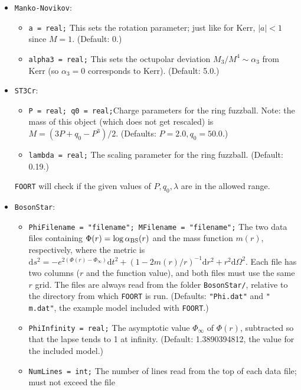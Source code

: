 \documentclass[11pt,a4paper]{article}
\newcommand{\code}[1]{{\tt #1}}
\newcommand{\rmd}{\mathrm{d}}
\begin{document}
\begin{itemize}
\item \code{Manko-Novikov}:
\begin{itemize}
\item \code{a = real;}\newline
This sets the rotation parameter; just like for Kerr, $|a|<1$ since $M=1$. (Default: 0.)
\item \code{alpha3 = real;}\newline
This sets the octupolar deviation $M_3/M^4\sim\alpha_3$ from Kerr (so $\alpha_3=0$ corresponds to Kerr). (Default: 5.0.)
\end{itemize}
\item \code{ST3Cr}:
\begin{itemize}
\item \code{P = real; q0 = real;}\newline Charge parameters for the ring fuzzball. Note: the mass of this object (which does not get rescaled) is $M=(3P+q_0-P^3)/2$. (Defaults: $P=2.0, q_0=50.0$.)
\item \code{lambda = real;} \newline The scaling parameter for the ring fuzzball. (Default: 0.19.)
\end{itemize}
\code{FOORT} will check if the given values of $P,q_0,\lambda$ are in the allowed range.
\item \code{BosonStar}: 
\begin{itemize}
\item \code{PhiFilename = "filename"; MFilename = "filename";}\newline
The two data files containing $\Phi(r) = \log\alpha_{\rm BS}(r)$ and the mass function
$m(r)$, respectively, where the metric is $\rmd s^2 = -e^{2(\Phi(r)-\Phi_\infty)
}\rmd t^2 + \left(1-2m(r)/r\right)^{-1}\rmd r^2 + r^2\rmd\Omega^2$. Each file has
two columns ($r$ and the function value), and both files must use the same $r$
grid. The files are always read from the folder \code{BosonStar/}, relative to the
directory from which \code{FOORT} is run. (Defaults: \code{"Phi.dat"} and \code{"
m.dat"}, the example model included with \code{FOORT}.)
\item \code{PhiInfinity = real;}\newline
The asymptotic value $\Phi_\infty$ of $\Phi(r)$, subtracted so that the lapse tends to
1 at infinity. (Default: 1.3890394812, the value for the included model.)
\item \code{NumLines = int;}\newline
The number of lines read from the top of each data file; must not exceed the file

\end{itemize}
\end{itemize}
\end{document}
